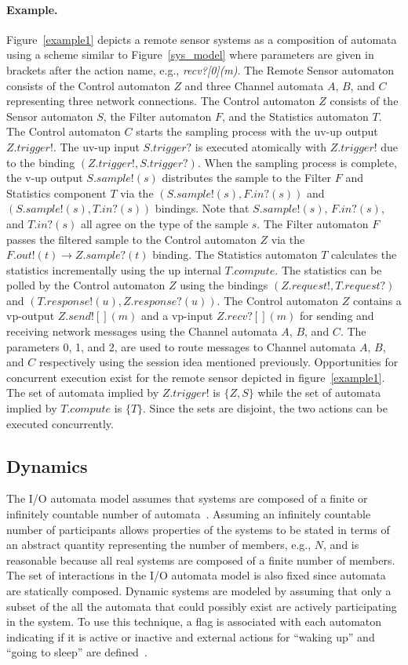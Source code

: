 \paragraph{Example.}
Figure~\ref{example1} depicts a remote sensor systems as a composition of automata using a scheme similar to Figure~\ref{sys_model} where parameters are given in brackets after the action name, e.g., \emph{recv?[0](m)}.
The Remote Sensor automaton consists of the Control automaton $Z$ and three Channel automata $A$, $B$, and $C$ representing three network connections.
The Control automaton $Z$ consists of the Sensor automaton $S$, the Filter automaton $F$, and the Statistics automaton $T$.
The Control automaton $C$ starts the sampling process with the uv-up output $Z.trigger!$.
The uv-up input $S.trigger?$ is executed atomically with $Z.trigger!$ due to the binding $(Z.trigger!, S.trigger?)$.
When the sampling process is complete, the v-up output $S.sample!(s)$ distributes the sample to the Filter $F$ and Statistics component $T$ via the $(S.sample!(s), F.in?(s))$ and $(S.sample!(s), T.in?(s))$ bindings.
Note that $S.sample!(s)$, $F.in?(s)$, and $T.in?(s)$ all agree on the type of the sample $s$.
The Filter automaton $F$ passes the filtered sample to the Control automaton $Z$ via the $F.out!(t) \to Z.sample?(t)$ binding.
The Statistics automaton $T$ calculates the statistics incrementally using the up internal $T.compute$.
The statistics can be polled by the Control automaton $Z$ using the bindings $(Z.request!, T.request?)$ and $(T.response!(u), Z.response?(u))$.
The Control automaton $Z$ contains a vp-output $Z.send![](m)$ and a vp-input $Z.recv?[](m)$ for sending and receiving network messages using the Channel automata $A$, $B$, and $C$.
The parameters 0, 1, and 2, are used to route messages to Channel automata $A$, $B$, and $C$ respectively using the session idea mentioned previously.
Opportunities for concurrent execution exist for the remote sensor depicted in figure~\ref{example1}.
The set of automata implied by $Z.trigger!$ is $\{Z, S\}$ while the set of automata implied by $T.compute$ is $\{T\}$.
Since the sets are disjoint, the two actions can be executed concurrently.

\subsection{Dynamics\label{dynamics}}

The I/O automata model assumes that systems are composed of a finite or infinitely countable number of automata~\cite{lynch1996distributed}.
Assuming an infinitely countable number of participants allows properties of the systems to be stated in terms of an abstract quantity representing the number of members, e.g., $N$, and is reasonable because all real systems are composed of a finite number of members.
The set of interactions in the I/O automata model is also fixed since automata are statically composed.
Dynamic systems are modeled by assuming that only a subset of the all the automata that could possibly exist are actively participating in the system.
To use this technique, a flag is associated with each automaton indicating if it is active or inactive and external actions for ``waking up'' and ``going to sleep'' are defined~\cite{lynch1996distributed}.

